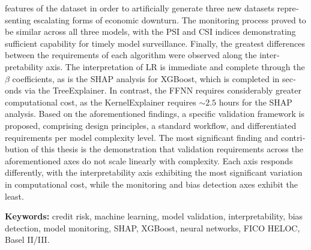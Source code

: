 \begin{english}
features of the dataset in order to artificially generate three new datasets
representing escalating forms of economic downturn. The monitoring process proved
to be similar across all three models, with the PSI and CSI indices demonstrating
sufficient capability for timely model surveillance. Finally, the greatest
differences between the requirements of each algorithm were observed along the
interpretability axis. The interpretation of LR is immediate and complete through
the $\beta$ coefficients, as is the SHAP analysis for XGBoost, which is completed
in seconds via the TreeExplainer. In contrast, the FFNN requires considerably
greater computational cost, as the KernelExplainer requires ${\sim}2{.}5$ hours
for the SHAP analysis. Based on the aforementioned findings, a specific validation
framework is proposed, comprising design principles, a standard workflow, and
differentiated requirements per model complexity level. The most significant
finding and contribution of this thesis is the demonstration that validation
requirements across the aforementioned axes do not scale linearly with complexity.
Each axis responds differently, with the interpretability axis exhibiting the most
significant variation in computational cost, while the monitoring and bias
detection axes exhibit the least.

\vspace{2cm}

\noindent\textbf{Keywords:} credit risk, machine learning, model
validation, interpretability, bias detection, model monitoring,
SHAP, XGBoost, neural networks, FICO HELOC, Basel II/III.

\end{english}